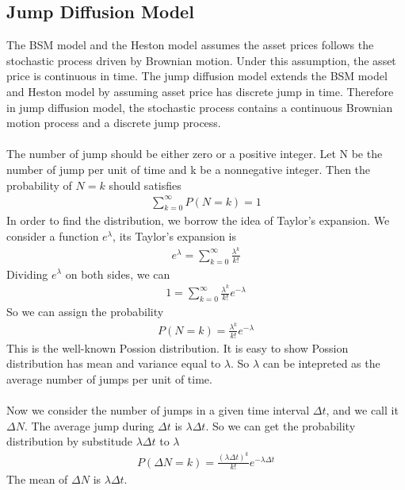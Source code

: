 \documentclass[a4paper]{article}
\begin{document}
\subsection{Jump Diffusion Model}
The BSM model and the Heston model assumes the asset prices follows the stochastic process driven by Brownian motion. Under this assumption, the asset price is continuous in time. The jump diffusion model extends the BSM model and Heston model by assuming asset price has discrete jump in time. Therefore in jump diffusion model, the stochastic process contains a continuous Brownian motion process and a discrete jump process.\\

\\
The number of jump should be either zero or a positive integer. Let N be the number of jump per unit of time and k be a nonnegative integer. Then the probability of $N = k$ should satisfies
\begin{align*}
	\sum_{k = 0}^\infty P(N = k) = 1
\end{align*}
In order to find the distribution, we borrow the idea of Taylor's expansion. We consider a function $e^{\lambda}$, its Taylor's expansion is
\begin{align*}
	e^{\lambda} = \sum_{k = 0}^\infty \frac{\lambda^k}{k!}
\end{align*}
Dividing $e^{\lambda}$ on both sides, we can
\begin{align*}
	1 = \sum_{k = 0}^\infty \frac{\lambda^k}{k!}e^{-\lambda} 
\end{align*}
So we can assign the probability
\begin{align*}
P(N = k) = \frac{\lambda^k}{k!}e^{-\lambda}
\end{align*}
This is the well-known Possion distribution. It is easy to show Possion distribution has mean and variance equal to $\lambda$. So $\lambda$ can be intepreted as the average number of jumps per unit of time.\\

\\
Now we consider the number of jumps in a given time interval $\Delta t$, and we call it $\Delta N$. The average jump during $\Delta t$ is $\lambda \Delta t$. So we can get the probability distribution by substitude $\lambda \Delta t$ to $\lambda$
\begin{align*}
	P(\Delta N = k) = \frac{(\lambda \Delta t)^k}{k!}e^{-\lambda \Delta t}
\end{align*}
The mean of $\Delta N$ is $\lambda \Delta t$.\\
\end{document}
